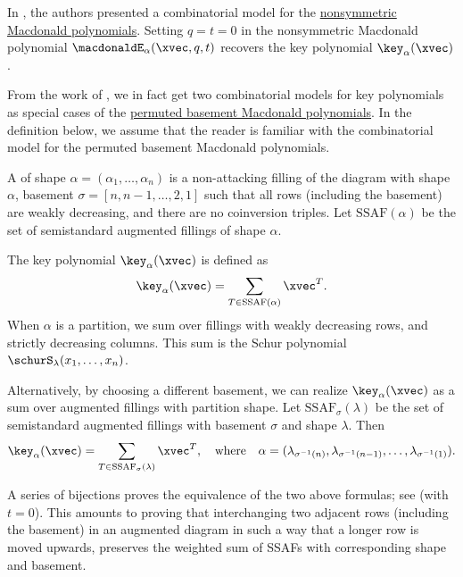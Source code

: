 In \cite{HaglundHaimanLoehr2008}, the authors presented a combinatorial model for the
\hyperref[macdonaldE]{nonsymmetric Macdonald polynomials}.
Setting $q=t=0$ in the nonsymmetric Macdonald polynomial
$\macdonaldE_{\alpha}(\xvec,q,t)$ recovers the key polynomial
$\key_\alpha(\xvec)$.


From the work of  \cite{Mason2009},
we in fact get two combinatorial models for key polynomials
as special cases of the \hyperref[macdonaldEperm]{permuted basement Macdonald polynomials}.
In the definition below, we assume that the reader is familiar with
the combinatorial model for the permuted basement Macdonald polynomials.


\begin{definition}
A \label{semistandardAugmentedFilling}
of shape $\alpha = (\alpha_1,\dotsc,\alpha_n)$
is a non-attacking filling of the diagram with shape $\alpha$,
basement $\sigma = [n,n-1,\dotsc,2,1]$ such that all rows (including the basement)
are weakly decreasing, and there are no coinversion triples.
Let $\mathrm{SSAF}(\alpha)$ be the set of semistandard augmented fillings
of shape $\alpha$.

The key polynomial $\key_\alpha(\xvec)$ is defined as
\[
\key_\alpha(\xvec) = \sum_{T \in \mathrm{SSAF}(\alpha)} \xvec^T.
\]
When $\alpha$ is a partition, we sum over fillings with
weakly decreasing rows, and strictly decreasing columns.
This sum is the Schur polynomial $\schurS_{\lambda}(x_1,\dotsc,x_n)$.

Alternatively, by choosing a different basement,
we can realize $\key_\alpha(\xvec)$ as a sum over augmented fillings
with partition shape.
Let $\mathrm{SSAF}_{\sigma}(\lambda)$ be the set of semistandard augmented fillings
with basement $\sigma$ and shape $\lambda$.
Then
\[
\key_\alpha(\xvec) = \sum_{T \in \mathrm{SSAF}_{\sigma}(\lambda)} \xvec^T,
\quad
\text{where} \quad
\alpha = (\lambda_{\sigma^{-1}(n)}, \lambda_{\sigma^{-1}(n-1)},\dotsc,\lambda_{\sigma^{-1}(1)}).
\]
\end{definition}

A series of bijections proves the equivalence of the two above formulas;
see \cite[Prop.~5.5]{AlexanderssonSawhney2019} (with $t=0$).
This amounts to proving that interchanging two adjacent rows
(including the basement) in an augmented diagram in such a way that a
longer row is moved upwards,
preserves the weighted sum of SSAFs with corresponding shape and basement.

